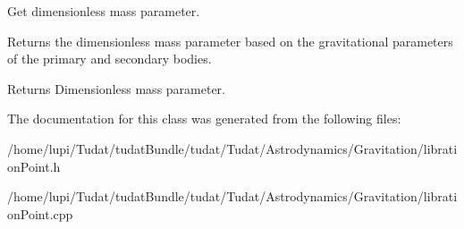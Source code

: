 Get dimensionless mass parameter. 

Returns the dimensionless mass parameter based on the gravitational parameters of the primary and secondary bodies. \begin{DoxyReturn}{Returns}
Dimensionless mass parameter. 
\end{DoxyReturn}


The documentation for this class was generated from the following files\+:\begin{DoxyCompactItemize}
\item 
/home/lupi/\+Tudat/tudat\+Bundle/tudat/\+Tudat/\+Astrodynamics/\+Gravitation/libration\+Point.\+h\item 
/home/lupi/\+Tudat/tudat\+Bundle/tudat/\+Tudat/\+Astrodynamics/\+Gravitation/libration\+Point.\+cpp\end{DoxyCompactItemize}
